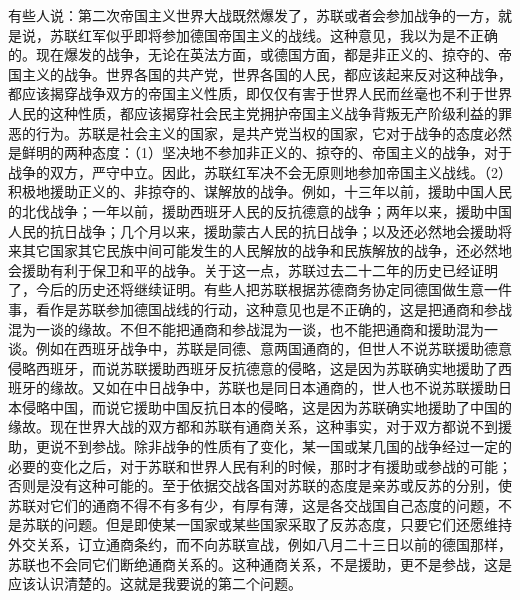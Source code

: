 有些人说：第二次帝国主义世界大战既然爆发了，苏联或者会参加战争的一方，就是说，苏联红军似乎即将参加德国帝国主义的战线。这种意见，我以为是不正确的。现在爆发的战争，无论在英法方面，或德国方面，都是非正义的、掠夺的、帝国主义的战争。世界各国的共产党，世界各国的人民，都应该起来反对这种战争，都应该揭穿战争双方的帝国主义性质，即仅仅有害于世界人民而丝毫也不利于世界人民的这种性质，都应该揭穿社会民主党拥护帝国主义战争背叛无产阶级利益的罪恶的行为。苏联是社会主义的国家，是共产党当权的国家，它对于战争的态度必然是鲜明的两种态度：（1）坚决地不参加非正义的、掠夺的、帝国主义的战争，对于战争的双方，严守中立。因此，苏联红军决不会无原则地参加帝国主义战线。（2）积极地援助正义的、非掠夺的、谋解放的战争。例如，十三年以前，援助中国人民的北伐战争；一年以前，援助西班牙人民的反抗德意的战争；两年以来，援助中国人民的抗日战争；几个月以来，援助蒙古人民的抗日战争；以及还必然地会援助将来其它国家其它民族中间可能发生的人民解放的战争和民族解放的战争，还必然地会援助有利于保卫和平的战争。关于这一点，苏联过去二十二年的历史已经证明了，今后的历史还将继续证明。有些人把苏联根据苏德商务协定同德国做生意一件事，看作是苏联参加德国战线的行动，这种意见也是不正确的，这是把通商和参战混为一谈的缘故。不但不能把通商和参战混为一谈，也不能把通商和援助混为一谈。例如在西班牙战争中，苏联是同德、意两国通商的，但世人不说苏联援助德意侵略西班牙，而说苏联援助西班牙反抗德意的侵略，这是因为苏联确实地援助了西班牙的缘故。又如在中日战争中，苏联也是同日本通商的，世人也不说苏联援助日本侵略中国，而说它援助中国反抗日本的侵略，这是因为苏联确实地援助了中国的缘故。现在世界大战的双方都和苏联有通商关系，这种事实，对于双方都说不到援助，更说不到参战。除非战争的性质有了变化，某一国或某几国的战争经过一定的必要的变化之后，对于苏联和世界人民有利的时候，那时才有援助或参战的可能；否则是没有这种可能的。至于依据交战各国对苏联的态度是亲苏或反苏的分别，使苏联对它们的通商不得不有多有少，有厚有薄，这是各交战国自己态度的问题，不是苏联的问题。但是即使某一国家或某些国家采取了反苏态度，只要它们还愿维持外交关系，订立通商条约，而不向苏联宣战，例如八月二十三日以前的德国那样，苏联也不会同它们断绝通商关系的。这种通商关系，不是援助，更不是参战，这是应该认识清楚的。这就是我要说的第二个问题。

